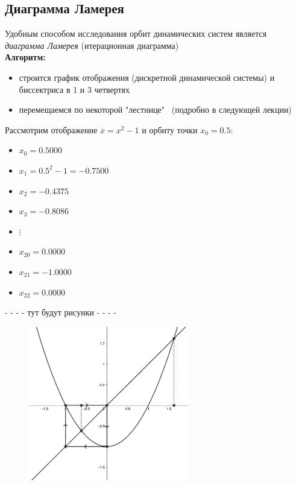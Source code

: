 \subsection{Диаграмма Ламерея}
Удобным способом исследования орбит динамических систем является \textit{диаграмма Ламерея} (итерационная диаграмма)
\\[2mm]
\textbf{Алгоритм{:} }
\begin{itemize}
    \item строится график отображения (дискретной динамической системы) и биссектриса в 1 и 3 четвертях
    \item перемещаемся по некоторой "лестнице" \, (подробно в следующей лекции)
\end{itemize}
Рассмотрим отображение \(\overline{x} = x^2 - 1 \) и орбиту точки \(x_0 = 0.5{:}\)
\begin{itemize}
    \item[] \(x_0 = 0.5000\)
    \item[] \(x_1 = 0.5^2 - 1 = -0.7500\)
    \item[] \(x_2 = -0.4375\)
    \item[] \(x_3 = -0.8086\)
    \item[] \(\vdots\)
    \item[] \(x_{20} = 0.0000 \)
    \item[] \(x_{21} = -1.0000 \)
    \item[] \(x_{22} = 0.0000 \)
\end{itemize}
- - - - тут будут рисунки - - - -


\begin{figure}[h]
    \includegraphics[width=7cm]{ris1}
    \centering
\end{figure}















